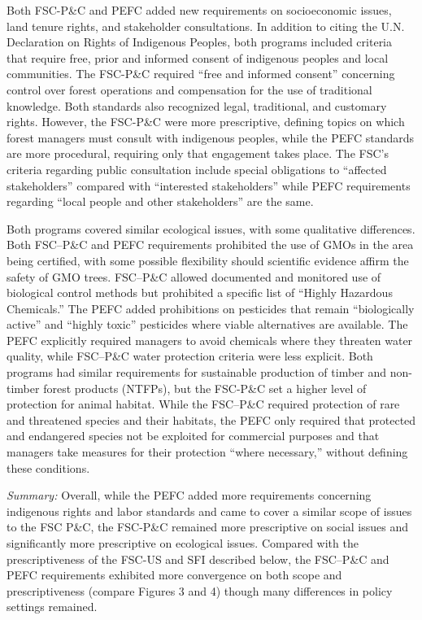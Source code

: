 \documentclass[
      12pt,
            Review ]{article}
\begin{document}
Both FSC-P\&C and PEFC added new requirements on socioeconomic issues, land tenure rights, and stakeholder consultations. In addition to citing the U.N. Declaration on Rights of Indigenous Peoples, both programs included criteria that require free, prior and informed consent of indigenous peoples and local communities. The FSC-P\&C required ``free and informed consent'' concerning control over forest operations and compensation for the use of traditional knowledge. Both standards also recognized legal, traditional, and customary rights. However, the FSC-P\&C were more prescriptive, defining topics on which forest managers must consult with indigenous peoples, while the PEFC standards are more procedural, requiring only that engagement takes place. The FSC's criteria regarding public consultation include special obligations to ``affected stakeholders'' compared with ``interested stakeholders'' while PEFC requirements regarding ``local people and other stakeholders'' are the same.

Both programs covered similar ecological issues, with some qualitative differences. Both FSC--P\&C and PEFC requirements prohibited the use of GMOs in the area being certified, with some possible flexibility should scientific evidence affirm the safety of GMO trees. FSC--P\&C allowed documented and monitored use of biological control methods but prohibited a specific list of ``Highly Hazardous Chemicals.'' The PEFC added prohibitions on pesticides that remain ``biologically active'' and ``highly toxic'' pesticides where viable alternatives are available. The PEFC explicitly required managers to avoid chemicals where they threaten water quality, while FSC--P\&C water protection criteria were less explicit. Both programs had similar requirements for sustainable production of timber and non-timber forest products (NTFPs), but the FSC-P\&C set a higher level of protection for animal habitat. While the FSC--P\&C required protection of rare and threatened species and their habitats, the PEFC only required that protected and endangered species not be exploited for commercial purposes and that managers take measures for their protection ``where necessary,'' without defining these conditions.

\emph{Summary:} Overall, while the PEFC added more requirements concerning indigenous rights and labor standards and came to cover a similar scope of issues to the FSC P\&C, the FSC-P\&C remained more prescriptive on social issues and significantly more prescriptive on ecological issues. Compared with the prescriptiveness of the FSC-US and SFI described below, the FSC--P\&C and PEFC requirements exhibited more convergence on both scope and prescriptiveness (compare Figures 3 and 4) though many differences in policy settings remained.
\end{document}

